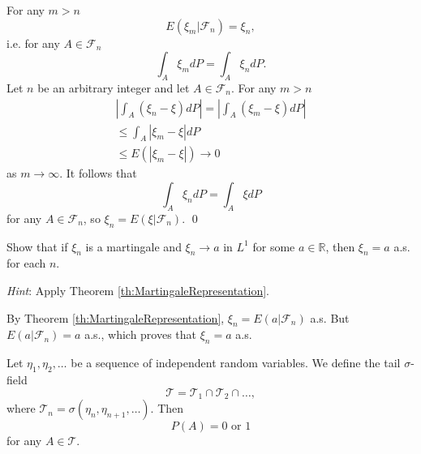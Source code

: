 \begin{Proof}
For any $m > n$
\[
E \left(\xi_{m} | \mathcal{F}_{n}\right) = \xi_{n},
\]
i.e. for any $A \in \mathcal{F}_n$
\[
\int_{A} \xi_{m} d P = \int_{A} \xi_{n} d P.
\]
Let $n$ be an arbitrary integer and let $A \in \mathcal{F}_n$. For any $m > n$
\[
\begin{array}{l}
\left| \int_{A} (\xi_{n} - \xi) d P \right| = \left| \int_{A} (\xi_{m} - \xi) d P \right| \\
\leq \int_{A} | \xi_{m} - \xi | d P \\
\leq E \left(\left| \xi_{m} - \xi \right|\right)\rightarrow 0
\end{array}
\]
as $m\to \infty$. It follows that
\[
\int_{A} \xi_{n} d P = \int_{A} \xi d P
\]
for any $A \in \mathcal{F}_n$, so $\xi_n = E(\xi|\mathcal{F}_n)$. \qed
\end{Proof}

\begin{Exercise}
\label{ex:MartingaleConvergesToConstant}
Show that if $\xi_{n}$ is a martingale and $\xi_{n} \to a$ in $L^{1}$ for some $a \in \mathbb{R}$, then $\xi_{n} = a$ a.s. for each $n$.

\textit{Hint}: Apply Theorem \ref{th:MartingaleRepresentation}.
\end{Exercise}

\begin{Solution}
\label{sol:Exercise47}
By Theorem \ref{th:MartingaleRepresentation}, $\xi_{n} = E(a|\mathcal{F}_{n})$ a.s. But $E(a|\mathcal{F}_n) = a$ a.s., which proves that $\xi_{n} = a$ a.s.
\end{Solution}

\begin{Theorem}
\label{th:Kolmogorovs01Law}
Let $\eta_1, \eta_2, \ldots$ be a sequence of independent random variables. We define the tail $\sigma$-field
\[
\mathcal{T} = \mathcal{T}_{1} \cap \mathcal{T}_{2} \cap \dots ,
\]
where $\mathcal{T}_n = \sigma (\eta_n,\eta_{n + 1},\ldots)$. Then
\[
P (A) = 0 \text{ or } 1
\]
for any $A \in \mathcal{T}$.
\end{Theorem}

